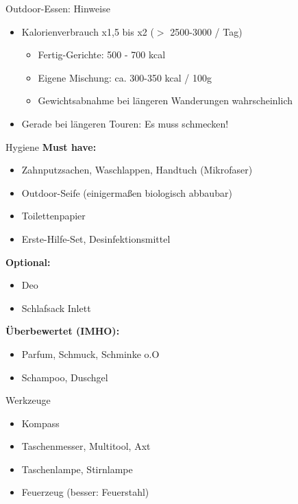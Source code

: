 \documentclass{beamer}
\begin{document}
			\begin{frame}{Outdoor-Essen: Hinweise}
				\begin{itemize}
					\item Kalorienverbrauch x1,5 bis x2 ($>$ 2500-3000 / Tag)
					\begin{itemize}
						\item Fertig-Gerichte: 500 - 700 kcal
						\item Eigene Mischung: ca. 300-350 kcal / 100g
						\item Gewichtsabnahme bei längeren Wanderungen wahrscheinlich
					\end{itemize}
					\item Gerade bei längeren Touren: Es muss schmecken!
				\end{itemize}
			\end{frame}
			
			\begin{frame}{Hygiene}
				\textbf{Must have:}
				\begin{itemize}
					\item Zahnputzsachen, Waschlappen, Handtuch (Mikrofaser)
					\item Outdoor-Seife (einigermaßen biologisch abbaubar)
					\item Toilettenpapier
					\item Erste-Hilfe-Set, Desinfektionsmittel
				\end{itemize}\pause
				\textbf{Optional:}
				\begin{itemize}
					\item Deo
					\item Schlafsack Inlett
				\end{itemize}\pause
				\textbf{Überbewertet (IMHO):}
				\begin{itemize}
					\item Parfum, Schmuck, Schminke o.O
					\item Schampoo, Duschgel
				\end{itemize}
			\end{frame}
			
			\begin{frame}{Werkzeuge}
				\begin{itemize}
					\item Kompass
					\item Taschenmesser, Multitool, Axt
					\item Taschenlampe, Stirnlampe
					\item Feuerzeug (besser: Feuerstahl)
				\end{itemize}
			\end{frame}
			
\end{document}
